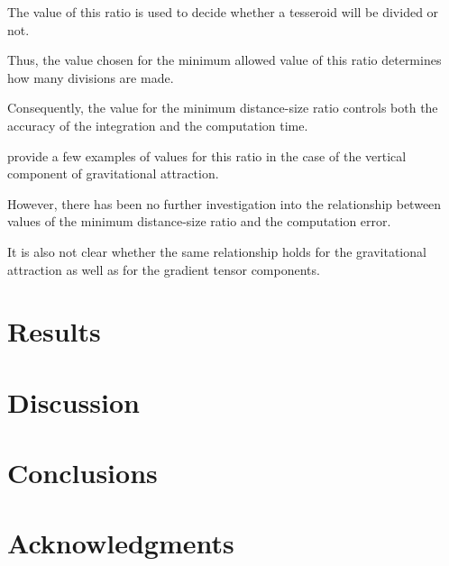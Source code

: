 \documentclass[paper,twocolumn]{geophysics}
\begin{document}
The value of this ratio is used to decide whether a tesseroid will be divided
or not.

Thus, the value chosen for the minimum allowed value of this ratio determines
how many divisions are made.

Consequently, the value for the minimum distance-size ratio controls both the
accuracy of the integration and the computation time.

\citet{Li2011} provide a few examples of values for this ratio in the case of
the vertical component of gravitational attraction.

However, there has been no further investigation into
the relationship between values of the minimum distance-size
ratio and the computation error.

It is also not clear whether the same relationship holds for the gravitational
attraction as well as for the gradient tensor components.


\section{Results}


\section{Discussion}

\section{Conclusions}

\section{Acknowledgments}




\end{document}
